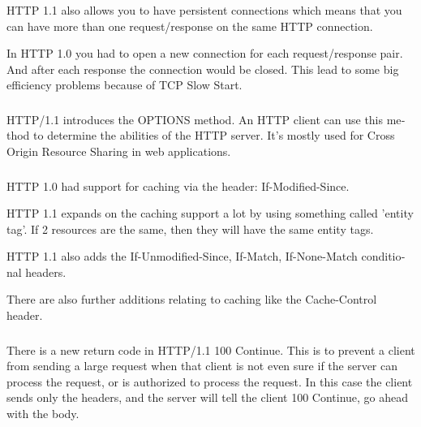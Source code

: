 \documentclass{article}
\begin{document}
\subsubsection{}
\begin{latin}
HTTP 1.1 also allows you to have persistent connections which means that you can have more than one request/response on the same HTTP connection.

In HTTP 1.0 you had to open a new connection for each request/response pair. And after each response the connection would be closed. This lead to some big efficiency problems because of TCP Slow Start.
\end{latin}


\subsubsection{}
\begin{latin}
HTTP/1.1 introduces the OPTIONS method. An HTTP client can use this method to determine the abilities of the HTTP server. It's mostly used for Cross Origin Resource Sharing in web applications.
\end{latin}


\subsubsection{}
\begin{latin}
HTTP 1.0 had support for caching via the header: If-Modified-Since.

HTTP 1.1 expands on the caching support a lot by using something called 'entity tag'. If 2 resources are the same, then they will have the same entity tags.

HTTP 1.1 also adds the If-Unmodified-Since, If-Match, If-None-Match conditional headers.

There are also further additions relating to caching like the Cache-Control header. 
\end{latin}


\subsubsection{}
\begin{latin}
There is a new return code in HTTP/1.1 100 Continue. This is to prevent a client from sending a large request when that client is not even sure if the server can process the request, or is authorized to process the request. In this case the client sends only the headers, and the server will tell the client 100 Continue, go ahead with the body. 
\end{latin}
\end{document}
